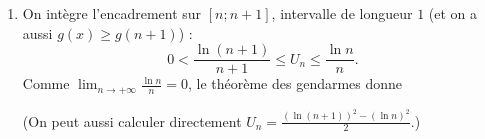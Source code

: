 \begin{enumerate}
\begin{enumerate}
            de plus $x > 1$ donc $\ln x > 0$ et $g(x) = \frac{\ln x}{x} > 0$.
            \par\noindent{}
         \item {}
            On int\`egre l'encadrement sur $[n ; n+1]$, intervalle de longueur $1$ (et on a aussi $g(x) \geq g(n+1)$) :
            \[
               0 < \frac{\ln(n+1)}{n+1} \leq U_n \leq \frac{\ln n}{n}.
            \]
            Comme $\displaystyle\lim_{n\to+\infty} \frac{\ln n}{n} = 0$, le th\'eor\`eme des gendarmes donne
            \par\noindent{}
            (On peut aussi calculer directement $U_n = \frac{(\ln(n+1))^2 - (\ln n)^2}{2}$.)
      \end{enumerate}
\end{enumerate}
